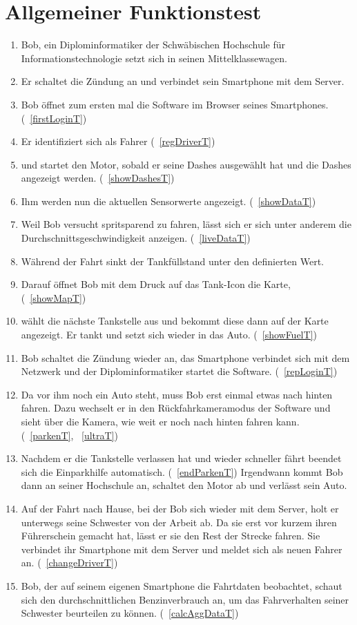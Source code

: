 \documentclass[pflichtenheft.tex]{subfiles}
\begin{document}
\section{Allgemeiner Funktionstest}
\begin{enumerate}
\item
Bob, ein Diplominformatiker der Schwäbischen Hochschule für Informationstechnologie setzt sich in seinen Mittelklassewagen. 
\item
Er schaltet die Zündung an und verbindet sein Smartphone mit dem Server. 
\item
Bob öffnet  zum ersten mal die Software im Browser seines Smartphones.  (~\ref{firstLoginT})
\item
Er identifiziert sich als Fahrer (~\ref{regDriverT})
\item
und startet den Motor, sobald er seine Dashes ausgewählt hat und die Dashes angezeigt werden. (~\ref{showDashesT})
\item
Ihm werden nun die aktuellen Sensorwerte angezeigt. (~\ref{showDataT})
\item
Weil Bob versucht spritsparend zu fahren, lässt sich er sich unter anderem die Durchschnittsgeschwindigkeit anzeigen. (~\ref{liveDataT})
\item
Während der Fahrt sinkt der Tankfüllstand unter den definierten Wert.
\item
 Darauf öffnet Bob mit dem Druck auf das Tank-Icon die Karte, (~\ref{showMapT})
\item
wählt die nächste Tankstelle aus und bekommt diese dann auf der Karte angezeigt. Er tankt und setzt sich wieder in das Auto. (~\ref{showFuelT})
\item
Bob schaltet die Zündung wieder an, das Smartphone verbindet sich mit dem Netzwerk und der Diplominformatiker startet die Software. (~\ref{repLoginT})
\item
Da vor ihm noch ein Auto steht, muss Bob erst einmal etwas nach hinten fahren. Dazu wechselt er in den Rückfahrkameramodus der Software und sieht über die Kamera, wie weit er noch nach hinten fahren kann. (~\ref{parkenT}, ~\ref{ultraT})
\item
Nachdem er die Tankstelle verlassen hat und wieder schneller fährt beendet sich die Einparkhilfe automatisch. (~\ref{endParkenT}) Irgendwann kommt Bob dann an seiner Hochschule an, schaltet den Motor ab und verlässt sein Auto. 
\item
Auf der Fahrt nach Hause, bei der Bob sich wieder mit dem Server, holt er unterwegs seine Schwester von der Arbeit ab. Da sie erst vor kurzem ihren Führerschein gemacht hat, lässt er sie den Rest der Strecke fahren. Sie verbindet ihr Smartphone mit dem Server und meldet sich als neuen Fahrer an. (~\ref{changeDriverT})
\item
Bob, der auf seinem eigenen Smartphone die Fahrtdaten beobachtet, schaut sich den durchschnittlichen Benzinverbrauch an, um das Fahrverhalten seiner Schwester beurteilen zu können. (~\ref{calcAggDataT})
\end{enumerate}
\end{document}
